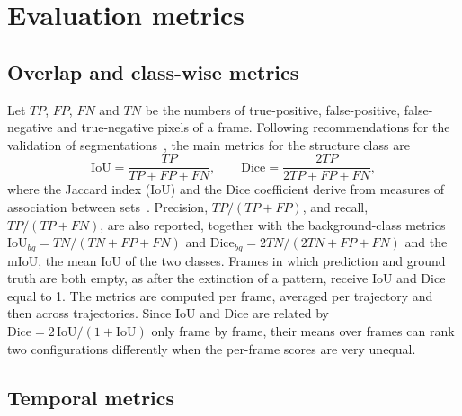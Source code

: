 \documentclass[final,5p,times,twocolumn]{elsarticle}
\begin{document}
\section{Evaluation metrics}\label{sec:sec5}

\subsection{Overlap and class-wise metrics}\label{subsec:overlap}

Let $TP$, $FP$, $FN$ and $TN$ be the numbers of true-positive, false-positive, false-negative and true-negative pixels of a frame. Following recommendations for the validation of segmentations~\cite{taha2015,maierhein2024}, the main metrics for the structure class are
\begin{equation}\label{eq:iou}
\mathrm{IoU}=\frac{TP}{TP+FP+FN}, \qquad \mathrm{Dice}=\frac{2TP}{2TP+FP+FN},
\end{equation}
where the Jaccard index (IoU) and the Dice coefficient derive from measures of association between sets~\cite{jaccard1912,dice1945}. Precision, $TP/(TP+FP)$, and recall, $TP/(TP+FN)$, are also reported, together with the background-class metrics $\mathrm{IoU}_{bg}=TN/(TN+FP+FN)$ and $\mathrm{Dice}_{bg}=2TN/(2TN+FP+FN)$ and the mIoU, the mean IoU of the two classes. Frames in which prediction and ground truth are both empty, as after the extinction of a pattern, receive IoU and Dice equal to 1. The metrics are computed per frame, averaged per trajectory and then across trajectories. Since IoU and Dice are related by $\mathrm{Dice}=2\,\mathrm{IoU}/(1+\mathrm{IoU})$ only frame by frame, their means over frames can rank two configurations differently when the per-frame scores are very unequal.

\subsection{Temporal metrics}\label{subsec:temporal}
\end{document}
